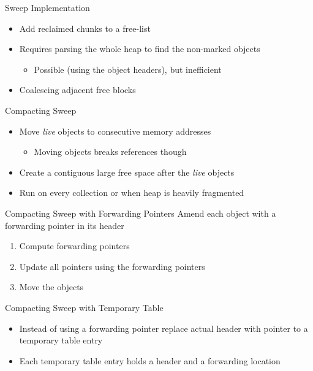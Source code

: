 \documentclass[
14pt,
aspectratio=169,
usenames,
dvipsnames,
x11names]{beamer}
\begin{document}
\begin{frame}{Sweep Implementation}
  \begin{itemize}  \setlength{\itemsep}{\fill}
  \item Add reclaimed chunks to a \alert{free-list}
  \item Requires \alert{parsing the whole heap} to find the non-marked objects
    \begin{itemize}
    \item  Possible (using the object headers), but \alert{inefficient}
    \end{itemize}
  \item \alert{Coalescing} adjacent free blocks
  \end{itemize}
\end{frame}

\begin{frame}{Compacting Sweep}
  \begin{itemize}  \setlength{\itemsep}{\fill}
  \item Move \textit{live} objects to consecutive memory addresses
    \begin{itemize}
    \item Moving objects \alert{breaks references} though
    \end{itemize}
  \item Create a \alert{contiguous large free space} after the \textit{live} objects
  \item Run on \alert{every collection} or when heap is \alert{heavily fragmented}
  \end{itemize}
\end{frame}

\begin{frame}{Compacting Sweep with Forwarding Pointers}
  \alert{Amend} each object with a forwarding pointer in its header\\

  \begin{enumerate}  \setlength{\itemsep}{\fill}
  \item \alert{Compute} forwarding pointers
  \item \alert{Update} all pointers using the forwarding pointers
  \item \alert{Move} the objects
  \end{enumerate}
\end{frame}

\begin{frame}{Compacting Sweep with Temporary Table}
  \begin{itemize}  \setlength{\itemsep}{\fill}
  \item Instead of using a forwarding pointer \alert{replace actual header with pointer to a temporary table entry}
  \item Each temporary table entry holds \alert{a header and a forwarding location}
  \end{itemize}
\end{frame}
\end{document}
